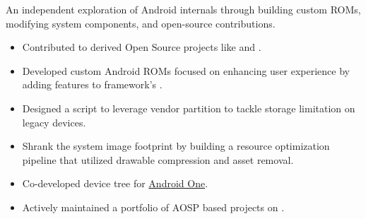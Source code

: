 An independent exploration of Android internals through building custom ROMs, modifying system components, and open-source contributions.
\begin{itemize}
  \item Contributed to  derived Open Source projects like  and .
  \item Developed custom Android ROMs focused on enhancing user experience by adding features to framework's . 
  \item Designed a script to leverage vendor partition to tackle storage limitation on legacy devices.
  \item Shrank the system image footprint by building a resource optimization pipeline that utilized drawable compression and asset removal.
  \item Co-developed device tree for \href{https://github.com/LineageOS/android_device_google_sprout}{Android One}.
  \item Actively maintained a portfolio of AOSP based projects on \href{https://forum.xda-developers.com/m/rharshit.4745111/}{}. 
 \end{itemize}

